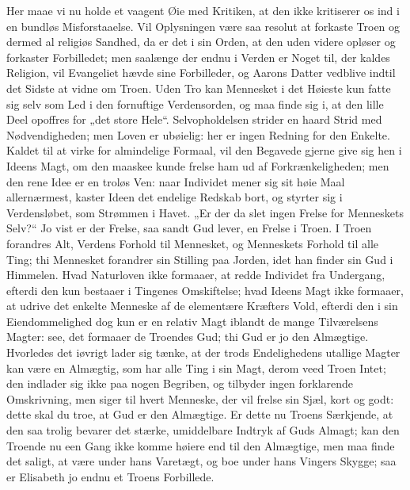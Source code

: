 \documentclass[12pt,a4paper]{book}
\begin{document}
Her maae vi nu holde et vaagent Øie med Kritiken, at den ikke
kritiserer os ind i en bundløs Misforstaaelse. Vil Oplysningen være saa
resolut at forkaste Troen og dermed al religiøs Sandhed, da er det i
sin Orden, at den uden videre opløser og forkaster Forbilledet; men
saalænge der endnu i Verden er Noget til, der kaldes Religion, vil
Evangeliet hævde sine Forbilleder, og Aarons Datter vedblive indtil det
Sidste at vidne om Troen. Uden Tro kan Mennesket i det Høieste kun
fatte sig selv som Led i den fornuftige Verdensorden, og maa finde sig
i, at den lille Deel opoffres for „det store Hele“. Selvopholdelsen
strider en haard Strid med Nødvendigheden; men Loven er ubøielig: her
er ingen Redning for den Enkelte. Kaldet til at virke for almindelige
Formaal, vil den Begavede gjerne give sig hen i Ideens Magt, om den
maaskee kunde frelse ham ud af Forkrænkeligheden; men den rene Idee er
en troløs Ven: naar Individet mener sig sit
høie Maal allernærmest, kaster Ideen det endelige Redskab bort, og
styrter sig i Verdensløbet, som Strømmen i Havet. „Er der da slet ingen
Frelse for Menneskets Selv?“ Jo vist er der Frelse, saa sandt Gud
lever, en Frelse i Troen. I Troen forandres Alt, Verdens Forhold til
Mennesket, og Menneskets Forhold til alle Ting; thi Mennesket forandrer
sin Stilling paa Jorden, idet han finder sin Gud i Himmelen. Hvad
Naturloven ikke formaaer, at redde Individet fra Undergang, efterdi den
kun bestaaer i Tingenes Omskiftelse; hvad Ideens Magt ikke formaaer, at
udrive det enkelte Menneske af de elementære Kræfters Vold, efterdi den
i sin Eiendommelighed dog kun er en relativ Magt iblandt de mange
Tilværelsens Magter: see, det formaaer de Troendes Gud; thi Gud er jo
den Almægtige. Hvorledes det iøvrigt lader sig tænke, at der trods
Endelighedens utallige Magter kan være en Almægtig, som har alle Ting i
sin Magt, derom veed Troen Intet; den indlader sig ikke paa nogen
Begriben, og tilbyder ingen forklarende Omskrivning, men siger til
hvert Menneske, der vil frelse sin Sjæl, kort og godt: dette skal du
troe, at Gud er den Almægtige. Er dette nu Troens Særkjende, at den saa
trolig bevarer det stærke, umiddelbare Indtryk af Guds Almagt; kan den
Troende nu een Gang ikke komme høiere end til den Almægtige, men maa
finde det saligt, at være under hans Varetægt, og boe under hans
Vingers Skygge; saa er Elisabeth jo endnu et Troens Forbillede.
\end{document}
